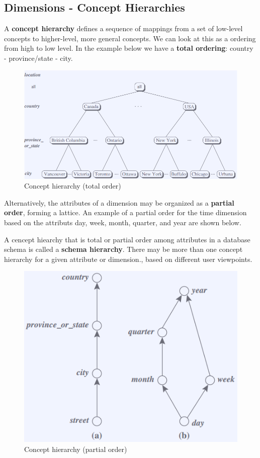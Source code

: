	\subsection{Dimensions - Concept Hierarchies}

		A {\bf concept hierarchy} defines a sequence of mappings from a set of low-level
		concepts to higher-level, more general concepts. We can look at this as a 
		ordering from high to low level. In the example below we have a {\bf total ordering}:
		country - province/state - city. 

		\begin{figure}[H]
			\centering
			\includegraphics[scale=0.35]{pics/totalorder.png}
			\caption{Concept hierarchy (total order)}
		\end{figure}

		Alternatively, the attributes of a dimension may be organized as a {\bf partial order}, 
		forming a lattice. An example of a partial order for the time dimension based on 
		the attributs day, week, month, quarter, and year are shown below.

		A cencept hiearchy that is total or partial order among attributes in a database
		schema is called a {\bf schema hierarchy}.
		There may be more than one concept hierarchy for a given attribute or dimension., 
		based on different user viewpoints.  

		\begin{figure}[H]
			\centering
			\includegraphics[scale=0.4]{pics/partialorder.png}
			\caption{Concept hierarchy (partial order)}
		\end{figure}

